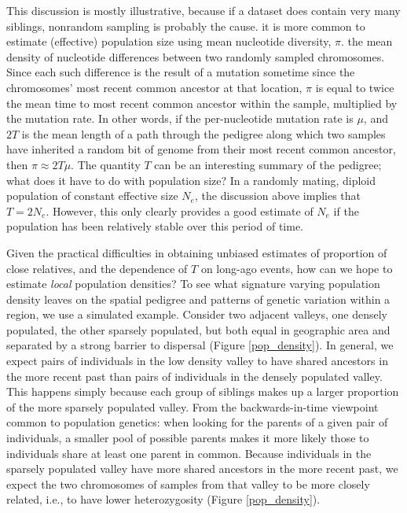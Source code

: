 \documentclass{ar-1col}
\begin{document}
This discussion is mostly illustrative, because
if a dataset does contain very many siblings,
nonrandom sampling is probably the cause.
it is more common to estimate (effective) population size
using mean nucleotide diversity, $\pi$.
the mean density of nucleotide differences between two randomly sampled chromosomes.
Since each such difference is the result of a mutation
sometime since the chromosomes' most recent common ancestor at that location,
$\pi$ is equal to twice the mean time to most recent common ancestor
within the sample, multiplied by the mutation rate.
In other words, if the per-nucleotide mutation rate is $\mu$,
and $2T$ is the mean length of a path through the pedigree
along which two samples have inherited a random bit of genome
from their most recent common ancestor,
then $\pi \approx 2 T \mu$.
The quantity $T$ can be an interesting summary of the pedigree;
what does it have to do with population size?
In a randomly mating, diploid population of constant effective size $N_e$,
the discussion above implies that $T = 2N_e$.
However, this only clearly provides a good estimate of $N_e$
if the population has been relatively stable over this period of time.

Given the practical difficulties in obtaining unbiased estimates of proportion of close relatives,
and the dependence of $T$ on long-ago events,
how can we hope to estimate \emph{local} population densities?
To see what signature varying population density leaves 
on the spatial pedigree and patterns of genetic variation
within a region,
we use a simulated example.
Consider two adjacent valleys, 
one densely populated, the other sparsely populated, 
but both equal in geographic area 
and separated by a strong barrier to dispersal (Figure \ref{pop_density}).
In general, we expect pairs of individuals in the low density valley 
to have shared ancestors in the more recent past than 
pairs of individuals in the densely populated valley.
This happens simply because 
each group of siblings makes up a larger proportion 
of the more sparsely populated valley.
From the backwards-in-time viewpoint common to population genetics:
when looking for the parents of a given pair of individuals,
a smaller pool of possible parents
makes it more likely those to individuals share at least one parent in common.
Because individuals in the sparsely populated valley have more shared ancestors 
in the more recent past, 
we expect the two chromosomes of samples from that valley to be more closely related,
i.e., to have lower heterozygosity 
(Figure \ref{pop_density}).
\end{document}
